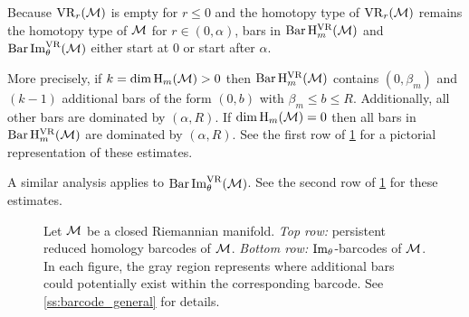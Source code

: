 Because $\mathrm{VR}_r(\mathcal{M})$ is empty for \(r \leq 0\) and the homotopy type of $\mathrm{VR}_r(\mathcal{M})$ remains the homotopy type of $\mathcal{M}$ for $r \in (0, \alpha)$, bars in \(\operatorname{Bar} \mathrm{H}_m^{\mathrm{VR}}(\mathcal{M})\) and $\operatorname{Bar}\operatorname{Im}_\theta^{\mathrm{VR}}(\mathcal{M})$ either start at $0$ or start after $\alpha$.

More precisely,
if \(k = \dim \operatorname{H}_m(\mathcal{M}) > 0\) then $\operatorname{Bar}\mathrm{H}_m^{\mathrm{VR}}(\mathcal{M})$ contains $(0, \beta_m)$ and \((k - 1)\) additional bars of the form \((0, b)\) with \(\beta_m \leq b \leq R\).
Additionally, all other bars are dominated by \((\alpha, R)\).
If \(\dim \operatorname{H}_m(\mathcal{M}) = 0\) then all bars in \(\operatorname{Bar}\mathrm{H}_m^{\mathrm{VR}}(\mathcal{M})\) are dominated by \((\alpha, R)\).
See the first row of \cref{fig:barcodes_general} for a pictorial representation of these estimates.

A similar analysis applies to $\operatorname{Bar}\operatorname{Im}_\theta^{\mathrm{VR}}(\mathcal{M})$.
See the second row of \cref{fig:barcodes_general} for these estimates.

\begin{figure}
	\centering
	
	\caption{Let $\mathcal{M}$ be a closed Riemannian manifold.
    \emph{Top row:} persistent reduced homology barcodes of $\mathcal{M}$.
	\emph{Bottom row:} $\operatorname{Im}_\theta$-barcodes of $\mathcal{M}$.
    In each figure, the gray region represents where additional bars could potentially exist within the corresponding barcode.
    See \cref{ss:barcode_general} for details.}
	\label{fig:barcodes_general}
\end{figure}